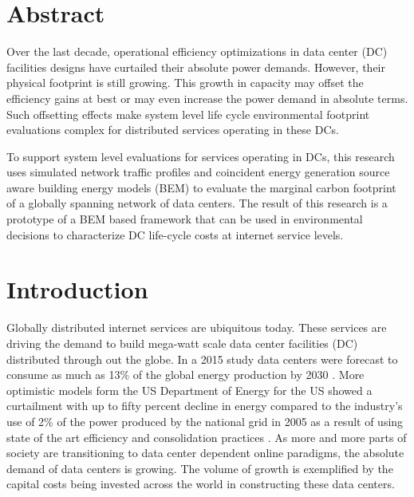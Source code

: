 \section{Abstract}	%
\addtocounter{section}{1}



Over the last decade, operational efficiency optimizations in data center (DC) facilities designs have curtailed their absolute power demands. However, their physical footprint is still growing. This growth in capacity may offset the efficiency gains at best or may even increase the power demand in absolute terms. Such offsetting effects make system level life cycle environmental footprint evaluations complex for distributed services operating in these DCs. 

To support system level evaluations for services operating in DCs, this research uses simulated network traffic profiles and coincident energy generation source aware building energy models (BEM) to evaluate the marginal carbon footprint of a globally spanning network of data centers. The result of this research is a prototype of a BEM based framework that can be used in environmental decisions to characterize DC life-cycle costs at internet service levels.




\section{Introduction}
Globally distributed internet services are ubiquitous today. These services are driving the demand to build mega-watt scale data center facilities (DC) distributed through out the globe. In a 2015 study data centers were forecast to consume as much as 13\% of the global energy production by 2030 \citep{andrae15}. More optimistic models form the US Department of Energy for the US showed a curtailment with up to fifty percent decline in energy compared to the industry's use of 2\% of the power produced by the national grid in 2005 as a result of using state of the art efficiency and consolidation practices \citep{Shehabi16}. As more and more parts of society are transitioning to data center dependent online paradigms, the absolute demand of data centers is growing. The volume of growth is exemplified by the capital costs being invested across the world in constructing these data centers.


